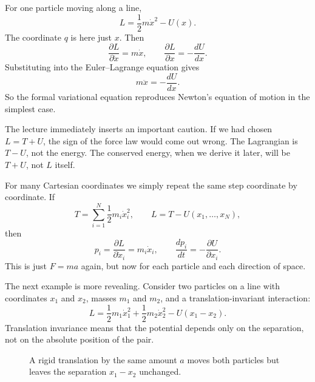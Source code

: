For one particle moving along a line,
\begin{equation}
L=\frac12 m\dot x^2-U(x).
\end{equation}
The coordinate \(q\) is here just \(x\). Then
\begin{equation}
\frac{\partial L}{\partial \dot x}=m\dot x,
\qquad
\frac{\partial L}{\partial x}=-\frac{dU}{dx}.
\end{equation}
Substituting into the Euler--Lagrange equation gives
\begin{equation}
m\ddot x=-\frac{dU}{dx}.
\end{equation}
So the formal variational equation reproduces Newton's equation of motion in the simplest case.

The lecture immediately inserts an important caution. If we had chosen \(L=T+U\), the sign of the force law would come out wrong. The Lagrangian is \(T-U\), not the energy. The conserved energy, when we derive it later, will be \(T+U\), not \(L\) itself.

For many Cartesian coordinates we simply repeat the same step coordinate by coordinate. If
\begin{equation}
T=\sum_{i=1}^{N}\frac12 m_i\dot x_i^2,
\qquad
L=T-U(x_1,\dots,x_N),
\end{equation}
then
\begin{equation}
p_i=\frac{\partial L}{\partial \dot x_i}=m_i\dot x_i,
\qquad
\frac{dp_i}{dt}=-\frac{\partial U}{\partial x_i}.
\end{equation}
This is just \(F=ma\) again, but now for each particle and each direction of space.

The next example is more revealing. Consider two particles on a line with coordinates \(x_1\) and \(x_2\), masses \(m_1\) and \(m_2\), and a translation-invariant interaction:
\begin{equation}
L=\frac12 m_1\dot x_1^2+\frac12 m_2\dot x_2^2-U(x_1-x_2).
\end{equation}
Translation invariance means that the potential depends only on the separation, not on the absolute position of the pair.

\begin{figure}
\centering
{}
\caption{A rigid translation by the same amount \(a\) moves both particles but leaves the separation \(x_1-x_2\) unchanged.}
\end{figure}

